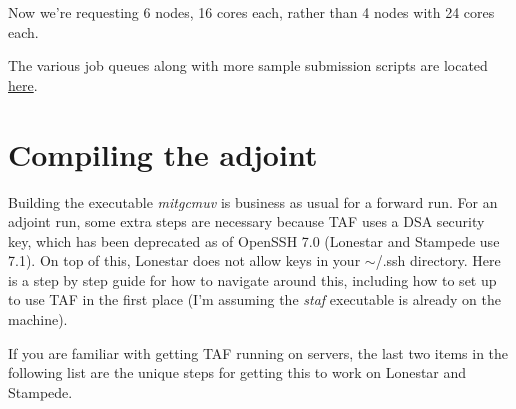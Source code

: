 \documentclass[a4paper,11pt]{article}
\begin{document}
	Now we're requesting 6 nodes, 16 cores each, rather than 4 nodes with 24 cores each. 

	The various job queues along with more sample submission scripts are located \href{https://portal.tacc.utexas.edu/user-guides/stampede#running}{here}.  

	\section{Compiling the adjoint} 
	Building the executable \textit{mitgcmuv} is business as usual for a forward run. For an adjoint run, some extra steps are necessary because TAF uses a DSA security key, which has been deprecated as of OpenSSH 7.0 (Lonestar and Stampede use 7.1). On top of this, Lonestar does not allow keys in your $\sim$/.ssh directory. Here is a step by step guide for how to navigate around this, including how to set up to use TAF in the first place (I'm assuming the \textit{staf} executable is already on the machine). 

	If you are familiar with getting TAF running on servers, the last two items in the following list are the unique steps for getting this to work on Lonestar and Stampede.
\end{document}
